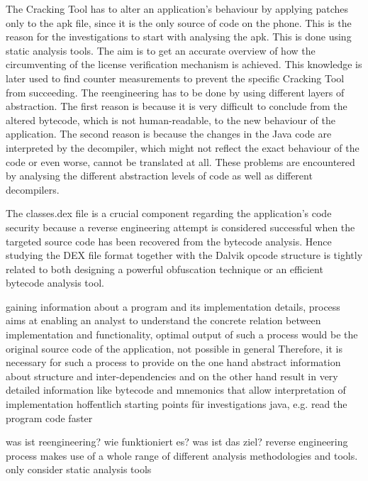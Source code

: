 The Cracking Tool has to alter an application's behaviour by applying patches only to the \gls{apk} file, since it is the only source of code on the phone. This is the reason for the investigations to start with analysing the \gls{apk}. This is done using static analysis tools. The aim is to get an accurate overview of how the circumventing of the license verification mechanism is achieved. This knowledge is later used to find counter measurements to prevent the specific Cracking Tool from succeeding.\newline
The reengineering has to be done by using different layers of abstraction. The first reason is because it is very difficult to conclude from the altered bytecode, which is not human-readable, to the new behaviour of the application. The second reason is because the changes in the Java code are interpreted by the decompiler, which might not reflect the exact behaviour of the code or even worse, cannot be translated at all.\newline
These problems are encountered by analysing the different abstraction levels of code as well as different decompilers.

%
The classes.dex file is a crucial component regarding the application’s code security because a reverse engineering attempt is considered successful when the targeted source code has been recovered from the bytecode analysis. Hence studying the DEX file format together with the Dalvik opcode structure is tightly related to both designing a powerful obfuscation technique or an efficient bytecode analysis tool.
\cite{kovachevaMaster}
%


gaining information about a program and its implementation
details, process aims at enabling an analyst to understand the concrete
relation between implementation and functionality, optimal output
of such a process would be the original source code of the application, not possible in general\newline
Therefore, it is necessary for such a process to provide on the one hand abstract information about structure and inter-dependencies and on the other hand result in very detailed information like bytecode and mnemonics that allow interpretation of implementation\newline
hoffentlich starting points für investigations\newline
java, e.g. read the program code faster\newline


was ist reengineering? wie funktioniert es? was ist das ziel?\newline
reverse engineering process makes use of a whole range of different analysis
methodologies and tools.\newline
only consider static analysis tools\newline

